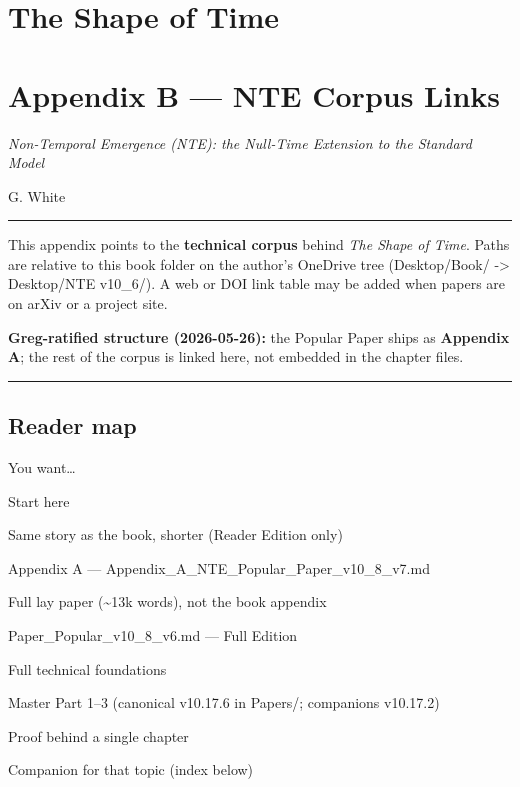 \documentclass[
  11pt,
]{article}
\author{}
\date{}
\begin{document}
\section{The Shape of Time}\label{the-shape-of-time}

\section{Appendix B --- NTE Corpus
Links}\label{appendix-b-nte-corpus-links}

\emph{Non-Temporal Emergence (NTE): the Null-Time Extension to the
Standard Model}

G. White

\begin{center}\rule{0.5\linewidth}{0.5pt}\end{center}

This appendix points to the \textbf{technical corpus} behind \emph{The
Shape of Time}. Paths are relative to this book folder on the author's
OneDrive tree (Desktop/Book/ -\textgreater{} Desktop/NTE v10\_6/). A web
or DOI link table may be added when papers are on arXiv or a project
site.

\textbf{Greg-ratified structure (2026-05-26):} the Popular Paper ships
as \textbf{Appendix A}; the rest of the corpus is linked here, not
embedded in the chapter files.

\begin{center}\rule{0.5\linewidth}{0.5pt}\end{center}

\subsection{Reader map}\label{reader-map}

You want\ldots{}

Start here

Same story as the book, shorter (Reader Edition only)

Appendix A --- Appendix\_A\_NTE\_Popular\_Paper\_v10\_8\_v7.md

Full lay paper (\textasciitilde13k words), not the book appendix

Paper\_Popular\_v10\_8\_v6.md --- Full Edition

Full technical foundations

Master Part 1--3 (canonical v10.17.6 in Papers/; companions v10.17.2)

Proof behind a single chapter

Companion for that topic (index below)
\end{document}
